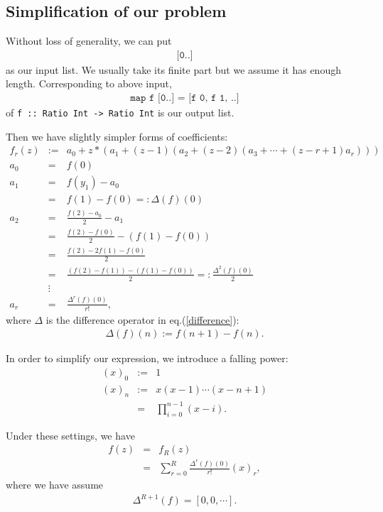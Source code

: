 \documentclass[11pt]{book}
\begin{document}
\subsection{Simplification of our problem}
Without loss of generality, we can put 
\begin{eqnarray}
\texttt{[0..]}
\end{eqnarray}
as our input list. 
We usually take its finite part but we assume it has enough length.
Corresponding to above input,
\begin{eqnarray}
\texttt{map f [0..] = [f 0, f 1, ..]}
\end{eqnarray}
of \texttt{f :: Ratio Int -> Ratio Int} is our output list.

Then we have slightly simpler forms of coefficients:
\begin{eqnarray}
f_r(z) &:=& a_0 + z*\left( a_1 +(z-1)\left(a_2 + (z-2)\left(a_3 + \cdots + (z-r+1)a_r \right) \right) \right) \qquad\qquad \\
a_0 &=& f(0) \\
a_1 &=& f(y_1) - a_0 \\
&=& f(1) - f(0) =: \Delta(f)(0) \\
a_2 &=& \frac{f(2)-a_0}{2}-a_1 \\
&=& \frac{f(2) - f(0)}{2} - \left( f(1) - f(0) \right) \\
&=& \frac{f(2)-2f(1)-f(0)}{2} \\
&=& \frac{\left( f(2)-f(1) \right) -\left(f(1)-f(0) \right)}{2} =: \frac{\Delta^2(f)(0)}{2} \\
\nonumber
&\vdots&\\
a_r &=& \frac{\Delta^r(f)(0)}{r!},
\end{eqnarray}
where $\Delta$ is the difference operator in eq.(\ref{difference}):
\begin{eqnarray}
\Delta(f)(n) := f(n+1) - f(n).
\end{eqnarray}

In order to simplify our expression, we introduce a falling power:
\begin{eqnarray}
(x)_0 &:=& 1 \\
(x)_n &:=& x(x-1) \cdots (x-n+1) \\
&=& \prod_{i=0}^{n-1} (x-i).
\end{eqnarray}

Under these settings, we have
\begin{eqnarray}
f(z) &=& f_R(z) \\
&=& \sum_{r=0}^R \frac{\Delta^r(f)(0)}{r!} (x)_r,
\end{eqnarray}
where we have assume
\begin{eqnarray}
\Delta^{R+1}(f) = [0,0,\cdots].
\end{eqnarray}
\end{document}

